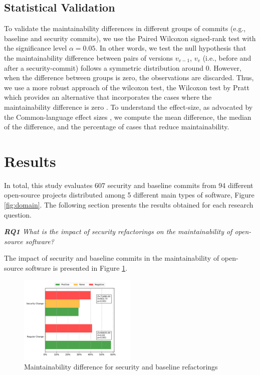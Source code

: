 \documentclass[10pt,conference]{IEEEtran}
\begin{document}
\subsection{Statistical Validation}\label{sec:statsval}

To validate the maintainability differences in different groups of commits (e.g., baseline and security commits), we use the Paired Wilcoxon signed-rank test \cite{10.2307/3001968} with the significance level $\alpha = 0.05$. In other words, we test the null hypothesis that the maintainability difference between pairs of versions $v_{v-1}$, $v_v$ (i.e., before and after a security-commit) follows a symmetric distribution around $0$. However, when the difference between groups is zero, the observations are discarded. Thus, we use a more robust approach of the wilcoxon test, the Wilcoxon test by Pratt which provides an alternative that incorporates the cases where the maintainability difference is zero \cite{10.2307/2282543}. To understand the effect-size, as advocated by the Common-language effect sizes \cite{graw:1992}, we compute the mean difference, the median of the difference, and the percentage of cases that reduce maintainability. 

\section{Results}\label{sec:results}

In total, this study evaluates $607$ security and baseline commits from 94 different open-source projects distributed among 5 different main types of software, Figure \ref{fig:domain}. The following section presents the results obtained for each research question.

\begin{framed}
\textit{\textbf{RQ1} What is the impact of security refactorings on the maintainability of open-source software?}
\end{framed}

The impact of security and baseline commits in the maintainability of open-source software is presented in Figure \ref{fig:secvsreg}. 

\begin{figure}[h]
 	\centering 	\includegraphics[width=0.5\textwidth]{figures/maintainability.pdf}
 	\caption{Maintainability difference for security and baseline refactorings}
	\label{fig:secvsreg}
\end{figure}
\end{document}
